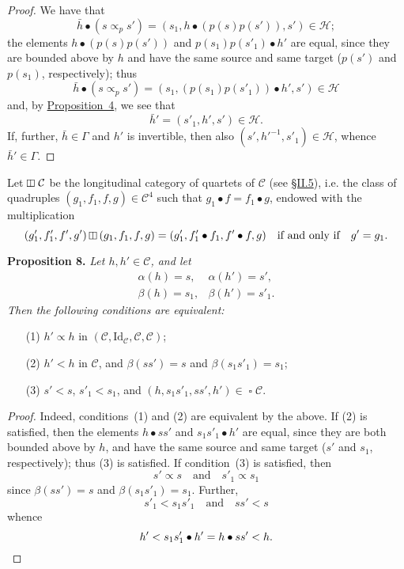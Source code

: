 \documentclass[a4paper,oneside,nobib,nofonts,notitlepage,notoc,nols,fleqn,justified]{tufte-book}
\newenvironment{itenv}[1]
  {\phantomsection\par\medskip\noindent\textbf{#1.}\itshape}
  {\par\medskip}
\newcommand{\oldpage}[1]{{\reversemarginpar\marginnote{\raggedleft\footnotesize\textit{p.~#1}}}}
\newcommand{\CC}{\mathcal{C}}
\newcommand{\HH}{\mathcal{H}}
\newcommand{\subs}{\mathrel{\propto}}
\newcommand{\Id}{\mathrm{Id}}
\DeclareMathOperator{\sq}{\square}
\DeclareMathOperator{\vsq}{\raisebox{-.1em}{\rotatebox{90}{$\boxminus$}\,}}
\newcommand{\vmult}{\mathbin{\raisebox{-.1em}{\rotatebox{90}{$\boxminus$}}}}
\begin{document}
\begin{proof}
  We have that
  \[
    \bar{h}\bullet(s\subs_p s')
    = (s_1,h\bullet(p(s)p(s')),s')
    \in\HH;
  \]
  the elements $h\bullet(p(s)p(s'))$ and $p(s_1)p(s'_1)\bullet h'$ are equal, since they are bounded above by $h$ and have the same source and same target ($p(s')$ and $p(s_1)$, respectively);
  thus
  \[
    \bar{h}\bullet(s\subs_p s')
    = (s_1,(p(s_1)p(s'_1))\bullet h',s')
    \in\HH
  \]
  and, by \hyperref[proposition:i-4]{Proposition~4}, we see that
  \[
    \bar{h}'
    = (s'_1,h',s')
    \in\HH.
  \]
  \oldpage{365}
  If, further, $\bar{h}\in\Gamma$ and $h'$ is invertible, then also $(s',h'^{-1},s'_1)\in\HH$, whence $\bar{h}'\in\Gamma$.
\end{proof}

Let $\vsq\CC$ be the longitudinal category of quartets of $\CC$ (see \hyperref[section:ii.5]{§II.5}), i.e. the class of quadruples $(g_1,f_1,f,g)\in\CC^4$ such that $g_1\bullet f=f_1\bullet g$, endowed with the multiplication
\[
  (g'_1,f'_1,f',g')\vmult(g_1,f_1,f,g)
  = (g'_1,f'_1\bullet f_1,f'\bullet f,g)
  \quad\text{if and only if}\quad
  g'=g_1.
\]

\begin{itenv}{Proposition 8}
\label{proposition:i-8}
  Let $h,h'\in\CC$, and let
  \[
    \begin{array}{ll}
      \alpha(h)
      = s,
      &\alpha(h')
      = s',
    \\\beta(h)
      = s_1,
      &\beta(h')
      = s'_1.
    \end{array}
  \]
  Then the following conditions are equivalent:
  \begin{enumerate}
    \item[\normalfont(1)]
      $h'\subs h$ in $(\CC,\Id_\CC,\CC,\CC)$;
    \item[\normalfont(2)]
      $h'<h$ in $\CC$, and $\beta(ss')=s$ and $\beta(s_1s'_1)=s_1$;
    \item[\normalfont(3)]
      $s'<s$, $s'_1<s_1$, and $(h,s_1s'_1,ss',h')\in\sq\CC$.
  \end{enumerate}
\end{itenv}

\begin{proof}
  Indeed, conditions~(1) and (2) are equivalent by the above.
  If (2) is satisfied, then the elements $h\bullet ss'$ and $s_1s'_1\bullet h'$ are equal, since they are both bounded above by $h$, and have the same source and same target ($s'$ and $s_1$, respectively);
  thus (3) is satisfied.
  If condition~(3) is satisfied, then
  \[
    s'\subs s
    \quad\text{and}\quad
    s'_1\subs s_1
  \]
  since $\beta(ss')=s$ and $\beta(s_1s'_1)=s_1$.
  Further,
  \[
    s'_1<s_1s'_1
    \quad\text{and}\quad
    ss'<s
  \]
  whence
  \[
    h'
    < s_1s'_1\bullet h'
    = h\bullet ss'
    < h.
    \qedhere
  \]
\end{proof}
\end{document}
